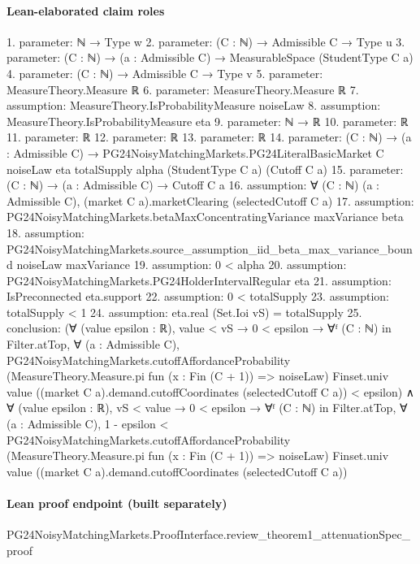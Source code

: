 \documentclass[10pt]{article}
\begin{document}
\paragraph{Lean-elaborated claim roles}\begin{ReviewVerbatim}
1. parameter: ℕ → Type w
2. parameter: (C : ℕ) → Admissible C → Type u
3. parameter: (C : ℕ) → (a : Admissible C) → MeasurableSpace (StudentType C a)
4. parameter: (C : ℕ) → Admissible C → Type v
5. parameter: MeasureTheory.Measure ℝ
6. parameter: MeasureTheory.Measure ℝ
7. assumption: MeasureTheory.IsProbabilityMeasure noiseLaw
8. assumption: MeasureTheory.IsProbabilityMeasure eta
9. parameter: ℕ → ℝ
10. parameter: ℝ
11. parameter: ℝ
12. parameter: ℝ
13. parameter: ℝ
14. parameter: (C : ℕ) →
  (a : Admissible C) →
    PG24NoisyMatchingMarkets.PG24LiteralBasicMarket C noiseLaw eta totalSupply alpha (StudentType C a) (Cutoff C a)
15. parameter: (C : ℕ) → (a : Admissible C) → Cutoff C a
16. assumption: ∀ (C : ℕ) (a : Admissible C), (market C a).marketClearing (selectedCutoff C a)
17. assumption: PG24NoisyMatchingMarkets.betaMaxConcentratingVariance maxVariance beta
18. assumption: PG24NoisyMatchingMarkets.source_assumption_iid_beta_max_variance_bound noiseLaw maxVariance
19. assumption: 0 < alpha
20. assumption: PG24NoisyMatchingMarkets.PG24HolderIntervalRegular eta
21. assumption: IsPreconnected eta.support
22. assumption: 0 < totalSupply
23. assumption: totalSupply < 1
24. assumption: eta.real (Set.Ioi vS) = totalSupply
25. conclusion: (∀ (value epsilon : ℝ),
    value < vS →
      0 < epsilon →
        ∀ᶠ (C : ℕ) in Filter.atTop,
          ∀ (a : Admissible C),
            PG24NoisyMatchingMarkets.cutoffAffordanceProbability
                (MeasureTheory.Measure.pi fun (x : Fin (C + 1)) => noiseLaw) Finset.univ value
                ((market C a).demand.cutoffCoordinates (selectedCutoff C a)) <
              epsilon) ∧
  ∀ (value epsilon : ℝ),
    vS < value →
      0 < epsilon →
        ∀ᶠ (C : ℕ) in Filter.atTop,
          ∀ (a : Admissible C),
            1 - epsilon <
              PG24NoisyMatchingMarkets.cutoffAffordanceProbability
                (MeasureTheory.Measure.pi fun (x : Fin (C + 1)) => noiseLaw) Finset.univ value
                ((market C a).demand.cutoffCoordinates (selectedCutoff C a))
\end{ReviewVerbatim}

\paragraph{Lean proof endpoint (built separately)}\begin{ReviewVerbatim}
PG24NoisyMatchingMarkets.ProofInterface.review_theorem1_attenuationSpec_proof
\end{ReviewVerbatim}
\end{document}
